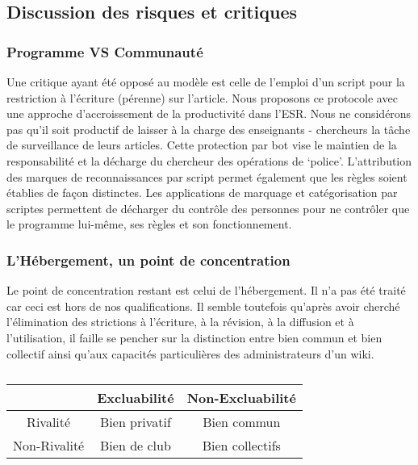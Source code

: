 \subsection{Discussion des risques et critiques}
\subsubsection{Programme VS Communauté}

Une critique ayant été opposé au modèle est celle de l'emploi d'un script pour la restriction à l'écriture (pérenne) sur l'article.
Nous proposons ce protocole avec une approche d'accroissement de la productivité dans l'\gls{ESR}.
Nous ne considérons pas qu'il soit productif de laisser à la charge des enseignants - chercheurs la tâche de surveillance de leurs articles.
Cette protection par bot vise le maintien de la responsabilité et la décharge du chercheur des opérations de `police'.
L'attribution des marques de reconnaissances par script permet également que les règles soient établies de façon distinctes.
Les applications de marquage et catégorisation par scriptes permettent de décharger du contrôle des personnes pour ne contrôler que le programme lui-même, ses règles et son fonctionnement.

\subsubsection{L'Hébergement, un point de concentration}
Le point de concentration restant est celui de l'hébergement.
Il n'a pas été traité car ceci est hors de nos qualifications.
Il semble toutefois qu'après avoir cherché l'élimination des strictions à l'écriture, à la révision, à la diffusion et à l'utilisation, il faille se pencher sur la distinction entre bien commun et bien collectif ainsi qu'aux capacités particulières des administrateurs d'un wiki.

\begin{table}[htbp]
\centering
\begin{tabular}{c|c|c} %
& Excluabilité & Non-Excluabilité \\
\hline
Rivalité & Bien privatif & Bien commun\\
\hline
Non-Rivalité & Bien de club & Bien collectifs \\
\end{tabular}
\caption{\cite[Annexe 1.]{beitone_biens_2010}}
\label{tab:biens_beitone}
\end{table}

